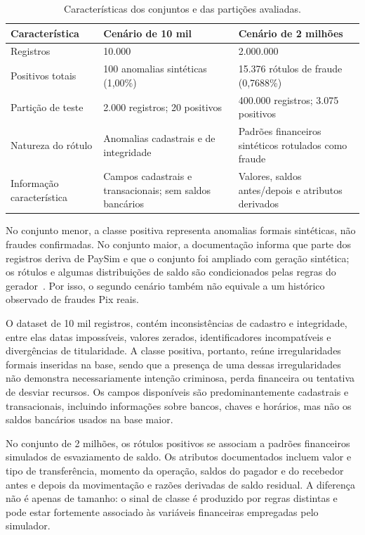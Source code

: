 \documentclass[11pt,a4paper]{article}
\begin{document}
\begin{table}[htbp]
    \centering
    \caption{Características dos conjuntos e das partições avaliadas.}\label{tab:datasets}%
    \small
    \begin{tabular}{p{3cm}p{5.15cm}p{5.15cm}}
        \toprule
        \textbf{Característica} & \textbf{Cenário de 10 mil} & \textbf{Cenário de 2 milhões} \\
        \midrule
        Registros & 10.000 & 2.000.000 \\
        Positivos totais & 100 anomalias sintéticas (1,00\%) & 15.376 rótulos de fraude (0,7688\%) \\
        Partição de teste & 2.000 registros; 20 positivos & 400.000 registros; 3.075 positivos \\
        Natureza do rótulo & Anomalias cadastrais e de integridade & Padrões financeiros sintéticos rotulados como fraude \\
        Informação característica & Campos cadastrais e transacionais; sem saldos bancários & Valores, saldos antes/depois e atributos derivados \\
        \bottomrule
    \end{tabular}
\end{table}

\FloatBarrier

No conjunto menor, a classe positiva representa anomalias formais sintéticas, não fraudes confirmadas. No conjunto maior, a documentação informa que parte dos registros deriva de PaySim e que o conjunto foi ampliado com geração sintética; os rótulos e algumas distribuições de saldo são condicionados pelas regras do gerador~\cite{messina2025pixfraudbr}. Por isso, o segundo cenário também não equivale a um histórico observado de fraudes Pix reais.

O dataset de 10 mil registros, contém inconsistências de cadastro e integridade, entre elas datas impossíveis, valores zerados, identificadores incompatíveis e divergências de titularidade. A classe positiva, portanto, reúne irregularidades formais inseridas na base, sendo que a presença de uma dessas irregularidades não demonstra necessariamente intenção criminosa, perda financeira ou tentativa de desviar recursos. Os campos disponíveis são predominantemente cadastrais e transacionais, incluindo informações sobre bancos, chaves e horários, mas não os saldos bancários usados na base maior.

No conjunto de 2 milhões, os rótulos positivos se associam a padrões financeiros simulados de esvaziamento de saldo. Os atributos documentados incluem valor e tipo de transferência, momento da operação, saldos do pagador e do recebedor antes e depois da movimentação e razões derivadas de saldo residual. A diferença não é apenas de tamanho: o sinal de classe é produzido por regras distintas e pode estar fortemente associado às variáveis financeiras empregadas pelo simulador. 
\end{document}
